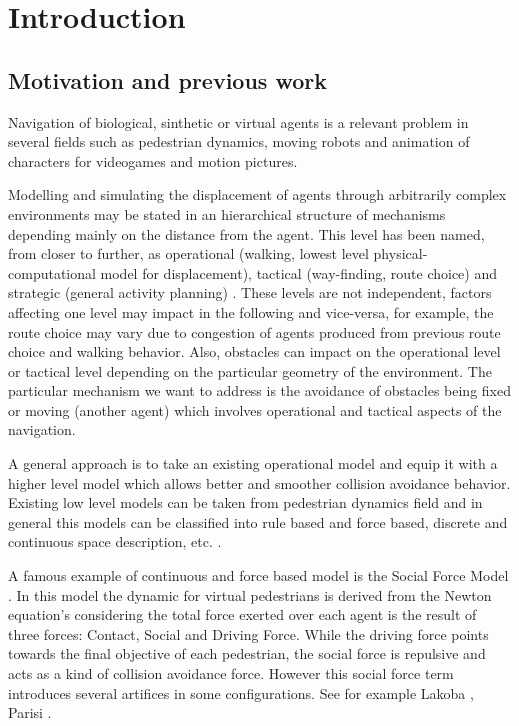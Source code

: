 \documentclass[draftclsnofoot]{IEEEtran}
\begin{document}
\section{Introduction}
\subsection{Motivation and previous work}

Navigation of biological, sinthetic or virtual agents is a relevant
problem in several fields such as pedestrian dynamics, moving robots
and animation of characters for videogames and motion pictures.

Modelling and simulating the displacement of agents through arbitrarily
complex environments may be stated in an hierarchical structure of
mechanisms depending mainly on the distance from the agent. This level
has been named, from closer to further, as operational (walking, lowest
level physical-computational model for displacement), tactical (way-finding,
route choice) and strategic (general activity planning) \cite{key-hoog2004}. 
These levels are not independent, factors affecting
one level may impact in the following and vice-versa, for example,
the route choice may vary due to congestion of agents produced from
previous route choice and walking behavior. Also, obstacles can impact
on the operational level or tactical level depending on the particular
geometry of the environment. The particular mechanism we want to address
is the avoidance of obstacles being fixed or moving (another agent)
which involves operational and tactical aspects of the navigation.

A general approach is to take an existing operational model and equip
it with a higher level model which allows better and smoother collision
avoidance behavior. Existing low level models can be taken from pedestrian
dynamics field and in general this models can be classified into rule
based and force based, discrete and continuous space description,
etc. \cite{key-scha2009}.

A famous example of continuous and force based model is the Social
Force Model \cite{key-helb1995, key-helb2000}. In this model the dynamic for
virtual pedestrians is derived from the Newton equation's considering
the total force exerted over each agent is the result of three forces:
Contact, Social and Driving Force. While the driving force points
towards the final objective of each pedestrian, the social force is
repulsive and acts as a kind of collision avoidance force. However
this social force term introduces several artifices in some configurations.
See for example Lakoba \cite{key-tara2005}, Parisi \cite{key-pari2009}.
\end{document}
